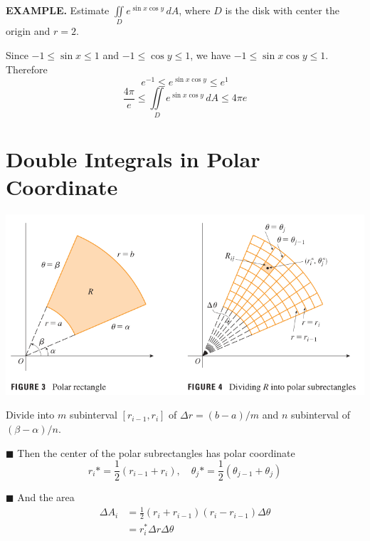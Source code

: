 \documentclass{article}
\begin{document}
{\selectfont \textbf{\textcolor{blue5}{ EXAMPLE.}}} Estimate $\iint \limits_{D }  e^{\sin{x} \cos{y}} \, dA $, where $D $ is the disk with center the origin and $r = 2 $. 

Since $-1 \le \sin{x} \le 1 $ and $-1 \le \cos{y} \le 1 $, we have $-1 \le \sin{x}\cos{y} \le 1 $. Therefore 
\[e^{-1} \le e^{\sin{x}\cos{y}} \le e^1  \]
\[\frac{4\pi }{e }  \le \iint \limits_{D }  e^{\sin{x} \cos{y}} \, dA \le 4 \pi e \]


\section{Double Integrals in Polar Coordinate}

\begin{minipage}[]{0.55\linewidth}
\includegraphics[width = 9 cm]{./images/explainpolar.png}
\end{minipage}
\begin{minipage}[]{0.42\linewidth}
    Divide into $m$ subinterval $[r_{i-1}, r_i]$ of $\Delta r = (b - a)/m$ and $n$ subinterval of $(\beta - \alpha)/ n $.

  \textcolor{blue5}{\small $\blacksquare$} Then the center of the polar subrectangles has polar coordinate \[r_i* = \frac{1 }{2 } (r_{i-1} + r_i ), \quad \theta_j* = \frac{1 }{2 } (\theta _ {j-1} + \theta_j)\]

   \textcolor{blue5}{\small $\blacksquare$} And the area 
   \begin{equation*}
     \begin{split}
       \Delta A_i & = \frac{1}{2} (r_i + r_{i-1})(r_i - r_{i-1})\Delta \theta \\ 
       & = r_i^* \Delta r \Delta \theta
     \end{split}
   \end{equation*}
   
\end{minipage}
\end{document}
